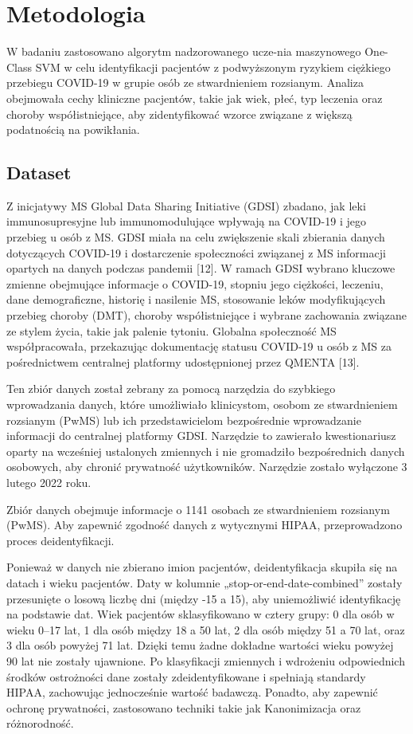 \documentclass[a4paper,fleqn]{cas-dc}
\begin{document}
\section{Metodologia}
W badaniu zastosowano algorytm nadzorowanego ucze-nia maszynowego One-Class SVM w celu identyfikacji pacjentów z podwyższonym ryzykiem ciężkiego przebiegu COVID-19 w grupie osób ze stwardnieniem rozsianym. Analiza obejmowała cechy kliniczne pacjentów, takie jak wiek, płeć, typ leczenia oraz choroby współistniejące, aby zidentyfikować wzorce związane z większą podatnością na powikłania.

\subsection{Dataset}
Z inicjatywy MS Global Data Sharing Initiative (GDSI) zbadano, jak leki immunosupresyjne lub immunomodulujące wpływają na COVID-19 i jego przebieg u osób z MS. GDSI miała na celu zwiększenie skali zbierania danych dotyczących COVID-19 i dostarczenie społeczności związanej z MS informacji opartych na danych podczas pandemii [12]. W ramach GDSI wybrano kluczowe zmienne obejmujące informacje o COVID-19, stopniu jego ciężkości, leczeniu, dane demograficzne, historię i nasilenie MS, stosowanie leków modyfikujących przebieg choroby (DMT), choroby współistniejące i wybrane zachowania związane ze stylem życia, takie jak palenie tytoniu. Globalna społeczność MS współpracowała, przekazując dokumentację statusu COVID-19 u osób z MS za pośrednictwem centralnej platformy udostępnionej przez QMENTA [13].

Ten zbiór danych został zebrany za pomocą narzędzia do szybkiego wprowadzania danych, które umożliwiało klinicystom, osobom ze stwardnieniem rozsianym (PwMS) lub ich przedstawicielom bezpośrednie wprowadzanie informacji do centralnej platformy GDSI. Narzędzie to zawierało kwestionariusz oparty na wcześniej ustalonych zmiennych i nie gromadziło bezpośrednich danych osobowych, aby chronić prywatność użytkowników. Narzędzie zostało wyłączone 3 lutego 2022 roku.

Zbiór danych obejmuje informacje o 1141 osobach ze stwardnieniem rozsianym (PwMS). Aby zapewnić zgodność danych z wytycznymi HIPAA, przeprowadzono proces deidentyfikacji. 

Ponieważ w danych nie zbierano imion pacjentów, deidentyfikacja skupiła się na datach i wieku pacjentów. Daty w kolumnie „stop-or-end-date-combined” zostały przesunięte o losową liczbę dni (między -15 a 15), aby uniemożliwić identyfikację na podstawie dat. Wiek pacjentów sklasyfikowano w cztery grupy: 0 dla osób w wieku 0–17 lat, 1 dla osób między 18 a 50 lat, 2 dla osób między 51 a 70 lat, oraz 3 dla osób powyżej 71 lat. Dzięki temu żadne dokładne wartości wieku powyżej 90 lat nie zostały ujawnione. Po klasyfikacji zmiennych i wdrożeniu odpowiednich środków ostrożności dane zostały zdeidentyfikowane i spełniają standardy HIPAA, zachowując jednocześnie wartość badawczą. Ponadto, aby zapewnić ochronę prywatności, zastosowano techniki takie jak Kanonimizacja oraz różnorodność.
\end{document}
